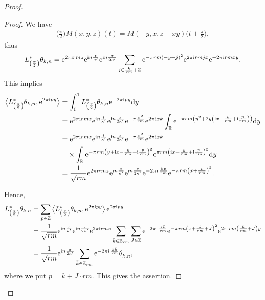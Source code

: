 \documentclass[10pt,a4paper]{amsart}
\newcommand\Z{{\mathbb Z}}
\newcommand\R{{\mathbb R}}
\newcommand\la{\langle}
\newcommand\ra{\rangle}
\numberwithin{equation}{section}
\begin{document}
\begin{proof}
\begin{proof}
We have
\begin{gather*}
 \bigg(\frac{\pi}{2}\bigg)M(x,y,z)(t)=M(-y,x,z-xy)\bigg(t+\frac{\pi}{2}\bigg),
 \end{gather*}
thus
\begin{gather*}
L^*_{\left(\frac{\pi}{2}\right)}\theta_{k,n}={\rm e}^{2\pi {\rm i}rmz}{\rm e}^{{\rm i}n\frac{t}{\kappa'}}{\rm e}^{{\rm i}n\frac{\pi}{2\kappa'}}
\sum_{j\in\frac{k}{rm}+\Z}{\rm e}^{-\pi rm(-y+j)^2}{\rm e}^{2\pi {\rm i}rmjx}{\rm e}^{-2\pi {\rm i}rmxy}.
\end{gather*}
This implies
\begin{align*}
\big\la L^*_{\left(\frac{\pi}{2}\right)}\theta_{k,n}, {\rm e}^{2\pi {\rm i}py}\big \ra & =
\int_0^1 L^*_{\left(\frac{\pi}{2}\right)}\theta_{k,n}{\rm e}^{-2\pi {\rm i}py} {\rm d}y
\\
&={\rm e}^{2\pi {\rm i}rmz}{\rm e}^{{\rm i}n\frac{t}{\kappa'}}{\rm e}^{{\rm i}n \frac{\pi}{2\kappa'}}
{\rm e}^{-\pi \frac{k^2}{rm}}{\rm e}^{2\pi {\rm i}xk}\int_{\R} {\rm e}^{-\pi rm\left(y^2+2y\left({\rm i}x-\frac k{rm}+{\rm i}\frac p{rm}\right)\right)}{\rm d}y
 \\
&={\rm e}^{2\pi {\rm i}rmz}{\rm e}^{{\rm i}n\frac{t}{\kappa'}}{\rm e}^{{\rm i}n\frac{\pi}{2\kappa'}}{\rm e}^{-\pi \frac{k^2}{rm}}{\rm e}^{2\pi {\rm i}xk} \\
&\quad \times\int_{\R} {\rm e}^{-\pi rm\left(y+{\rm i}x-\frac{k}{rm}+{\rm i}\frac{p}{rm}\right)^2}
{\rm e}^{\pi rm\left({\rm i}x-\frac{k}{rm}+{\rm i}\frac{p}{rm}\right)^2}{\rm d}y
\\
&=\frac{1}{\sqrt{rm}}{\rm e}^{2\pi {\rm i}rmz}{\rm e}^{{\rm i}n\frac{t}{\kappa'}}{\rm e}^{{\rm i}n\frac{\pi}{2\kappa'}}
{\rm e}^{-2\pi {\rm i}\,\frac{kp}{rm}}{\rm e}^{-\pi rm\left(x+\frac{p}{rm}\right)^2}.
\end{align*}

Hence,
\begin{align*}
L^*_{\left(\frac{\pi}{2}\right)} \theta_{k,n}&
=\sum_{p\in\Z} \big\la L^*_{\left(\frac{\pi}{2}\right)} \theta_{k,n}, {\rm e}^{2\pi {\rm i}py}\big\ra \,{\rm e}^{2\pi {\rm i}py}
\\
&=\frac1{\sqrt{rm}}{\rm e}^{{\rm i}n\frac t{\kappa'}}{\rm e}^{{\rm i}n\frac{\pi}{2\kappa'}}{\rm e}^{2\pi {\rm i}rmz}\sum_{\bar k\in\Z_{rm}}\sum_{J\in\Z} {\rm e}^{-2\pi {\rm i}\,\frac{k\bar k}{rm}}{\rm e}^{-\pi rm\left(x+\frac{\bar k}{rm}+J\right)^2}{\rm e}^{2\pi {\rm i} rm \left(\frac{\bar k}{rm}+J\right)y}
\\
&= \frac{1}{\sqrt{rm}}{\rm e}^{{\rm i}n\frac{\pi}{2\kappa'}}\sum_{\bar k\in\Z_{rm}}{\rm e}^{-2\pi {\rm i}\,\frac{k\bar k}{rm}}\theta_{\bar k,n},
\end{align*}
where we put $p=\bar k+J\cdot rm$. This gives the assertion.
\end{proof}


\end{proof}
\end{document}
